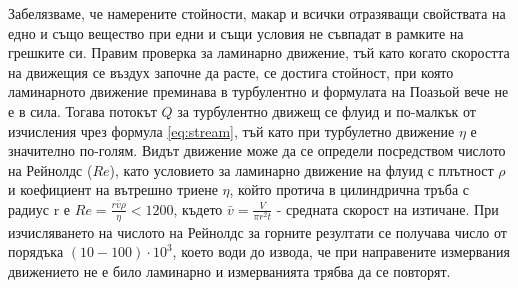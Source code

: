 \documentclass[12pt]{article}
\begin{document}
Забелязваме, че намерените стойности, макар и всички отразяващи свойствата на едно и също вещество при едни и същи условия не съвпадат в рамките на грешките си. Правим проверка за ламинарно движение, тъй като когато скоростта на движещия се въздух започне да расте, се достига стойност, при която ламинарното движение преминава в турбулентно и формулата на Поазьой вече не е в сила. Тогава потокът $Q$ за турбулентно движещ се флуид и по-малкък от изчисления чрез формула \ref{eq:stream}, тъй като при турбулетно движение $\eta$ е значително по-голям. Видът движение може да се определи посредством числото на Рейнолдс ($Re$), като условието за ламинарно движение на флуид с плътност $\rho$ и коефициент на вътрешно триене $\eta$, който протича в цилиндрична тръба с радиус r е $Re = \frac{r \bar{v} \rho}{\eta} < 1200$, където $\bar{v} = \frac{V}{\pi r^2 t}$ - средната скорост на изтичане. При изчисляването на числото на Рейнолдс за горните резултати се получава число от порядъка $(10-100)\cdot 10^3$, което води до извода, че при направените измервания движението не е било ламинарно и измерванията трябва да се повторят.
\end{document}
